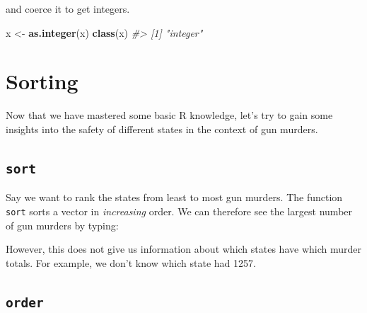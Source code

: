 \documentclass[
]{krantz}
\newenvironment{Shaded}{\begin{snugshade}}{\end{snugshade}}
\newcommand{\CommentTok}[1]{\textcolor[rgb]{0.37,0.37,0.37}{\textit{#1}}}
\newcommand{\DataTypeTok}[1]{\textcolor[rgb]{0.27,0.27,0.27}{#1}}
\newcommand{\KeywordTok}[1]{\textcolor[rgb]{0.27,0.27,0.27}{\textbf{#1}}}
\newcommand{\NormalTok}[1]{#1}
\newcommand{\OperatorTok}[1]{\textcolor[rgb]{0.43,0.43,0.43}{\textbf{#1}}}
\newcommand{\StringTok}[1]{\textcolor[rgb]{0.5,0.5,0.5}{#1}}
\begin{document}
and coerce it to get integers.

\begin{Shaded}
\begin{Highlighting}[]
\NormalTok{x <-}\StringTok{ }\KeywordTok{as.integer}\NormalTok{(x)}
\KeywordTok{class}\NormalTok{(x)}
\CommentTok{#> [1] "integer"}
\end{Highlighting}
\end{Shaded}

\hypertarget{sorting}{%
\section{Sorting}\label{sorting}}

Now that we have mastered some basic R knowledge, let's try to gain some insights into the safety of different states in the context of gun murders.

\hypertarget{sort}{%
\subsection{\texorpdfstring{\texttt{sort}}{sort}}\label{sort}}

Say we want to rank the states from least to most gun murders. The function \texttt{sort} sorts a vector in \emph{increasing} order. We can therefore see the largest number of gun murders by typing:

\begin{Shaded}
\end{Shaded}

However, this does not give us information about which states have which murder totals. For example, we don't know which state had 1257.

\hypertarget{order}{%
\subsection{\texorpdfstring{\texttt{order}}{order}}\label{order}}
\end{document}
